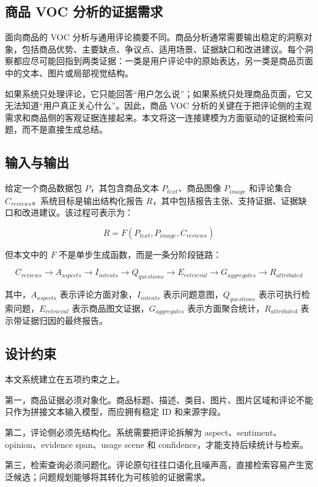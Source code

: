 \documentclass[11pt]{article}
\begin{document}
\subsection{商品 VOC 分析的证据需求}

面向商品的 VOC 分析与通用评论摘要不同。商品分析通常需要输出稳定的洞察对象，包括商品优势、主要缺点、争议点、适用场景、证据缺口和改进建议。每个洞察都应尽可能回指到两类证据：一类是用户评论中的原始表达，另一类是商品页面中的文本、图片或局部视觉结构。

如果系统只处理评论，它只能回答``用户怎么说''；如果系统只处理商品页面，它又无法知道``用户真正关心什么''。因此，商品 VOC 分析的关键在于把评论侧的主观需求和商品侧的客观证据连接起来。本文将这一连接建模为方面驱动的证据检索问题，而不是直接生成总结。

\subsection{输入与输出}

给定一个商品数据包 \(P\)，其包含商品文本 \(P_{text}\)、商品图像 \(P_{image}\) 和评论集合 \(C_{reviews}\)。系统目标是输出结构化报告 \(R\)，其中包括报告主张、支持证据、证据缺口和改进建议。该过程可表示为：

\[
R = F(P_{text}, P_{image}, C_{reviews})
\]

但本文中的 \(F\) 不是单步生成函数，而是一条分阶段链路：

\[
C_{reviews} \rightarrow A_{aspects} \rightarrow I_{intents} \rightarrow Q_{questions} \rightarrow E_{retrieval} \rightarrow G_{aggregates} \rightarrow R_{attributed}
\]

其中，\(A_{aspects}\) 表示评论方面对象，\(I_{intents}\) 表示问题意图，\(Q_{questions}\) 表示可执行检索问题，\(E_{retrieval}\) 表示商品图文证据，\(G_{aggregates}\) 表示方面聚合统计，\(R_{attributed}\) 表示带证据归因的最终报告。

\subsection{设计约束}

本文系统建立在五项约束之上。

第一，商品证据必须对象化。商品标题、描述、类目、图片、图片区域和评论不能只作为拼接文本输入模型，而应拥有稳定 ID 和来源字段。

第二，评论侧必须先结构化。系统需要把评论拆解为 aspect、sentiment、opinion、evidence span、usage scene 和 confidence，才能支持后续统计与检索。

第三，检索查询必须问题化。评论原句往往口语化且噪声高，直接检索容易产生宽泛候选；问题规划能够将其转化为可核验的证据需求。
\end{document}
